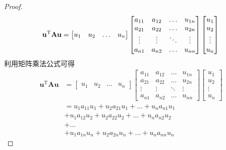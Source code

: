 \documentclass[withoutpreface,bwprint]{NoteBook}
\begin{document}
\begin{proof}
$$
    \mathbf{u}^\mathrm{T} \mathbf{A} \mathbf{u} 
    =
    \begin{bmatrix}
    u_1 & u_2 & \dots & u_n 
    \end{bmatrix}
    \begin{bmatrix}
        a_{11} & a_{12} & \dots & u_{1n} \\
        a_{21} & a_{22} & \dots & u_{2n} \\
        \vdots & \vdots & \ddots & \vdots \\
        a_{n1} & a_{n2} & \dots & u_{nn} 
    \end{bmatrix}
    \begin{bmatrix}
        u_1 \\ 
        u_2 \\ 
        \vdots \\
        u_n 
    \end{bmatrix} \\
$$
利用矩阵乘法公式可得
\begin{align}
    \label{eq:矩阵求导公式4_3的展开式}
    \nonumber
    \mathbf{u}^\mathrm{T} \mathbf{A} \mathbf{u} 
    &=
    \nonumber
    \begin{bmatrix}
    u_1 & u_2 & \dots & u_n 
    \end{bmatrix}
    \begin{bmatrix}
        a_{11} & a_{12} & \dots & u_{1n} \\
        a_{21} & a_{22} & \dots & u_{2n} \\
        \vdots & \vdots & \ddots & \vdots \\
        a_{n1} & a_{n2} & \dots & u_{nn} 
    \end{bmatrix}
    \begin{bmatrix}
        u_1 \\ 
        u_2 \\ 
        \vdots \\
        u_n 
    \end{bmatrix} \\
    &=
    \nonumber
    u_1 a_{11} u_1 + u_2 a_{21} u_1 + \dots + u_n a_{n1} u_1 \\
    & \nonumber
    + u_1 a_{12} u_2 + u_2 a_{22} u_2 + \dots + u_n a_{n2} u_2 \\
    & \nonumber
    + \dots \\
    &+ u_1 a_{1n} u_n + u_2 a_{2n} u_n  + \dots + u_n a_{nn} u_n 
\end{align}


\end{proof}
\end{document}
